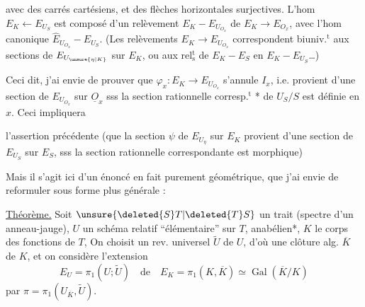 avec des carrés cartésiens, et des flèches horizontales surjectives. L'hom $E_K\longleftarrow E_{U_S}$ est composé d'un relèvement $E_K-E_{U_{O_x}}$ de $E_K\longrightarrow E_{O_x}$, avec l'hom canonique $\widehat E_{U_{O_x}}-E_{U_S}$. (Les  relèvements $E_K\longrightarrow E_{U_{O_x}}$ correspondent biuniv.$^{\mathrm t}$ aux sections de $E_{U_{\unsure{\eta|K}}}$ sur $E_K$, ou aux rel$^{\mathrm t}_{\mathrm s}$ de $E_K-E_S$ en $E_K-E_{U_S}$\ldots)

Ceci dit, j'ai envie de prouver que $\varphi_x:E_K\longrightarrow E_{U_{O_x}}$ s'annule  $I_x$, i.e. provient d'une section de $E_{U_{O_x}}$ sur $\underline O_x$ sss la section rationnelle corresp.$^{\mathrm t}$ * de $U_S/S$ est définie en $x$. Ceci impliquera

l'assertion précédente (que la section $\psi$ de $E_{U_\eta}$ sur $E_K$ provient d'une section de $E_{U_S}$ sur $E_S$, sss la section rationnelle correspondante est morphique)

Mais il s'agit ici d'un énoncé en fait purement géométrique, que j'ai envie de reformuler sous forme plus générale :

\uline{Théorème.}  Soit $\unsure{\deleted{S}T|\deleted{T}S}$ un trait (spectre d'un anneau-jauge), $U$ un schéma relatif ``élémentaire'' sur $T$, anabélien*, $K$ le corps des fonctions de $T$, On choisit un rev. universel $\widetilde U$ de $U$, d'où une clôture alg. $\overline K$ de $K$, et on considère l'extension
\[
E_U=\pi_1(U;\widetilde U)\quad\text{de}\quad E_K=\pi_1(K,\overline K)\simeq\operatorname{Gal}(\overline K/K)
\]
par $\pi=\pi_1(U_{\overline K},\widetilde U)$.   \unsure{\deleted{,}|,} 

